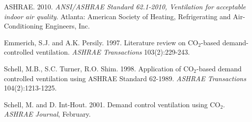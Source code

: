 ASHRAE. 2010. \emph{ANSI/ASHRAE Standard 62.1-2010, Ventilation for acceptable indoor air quality}. Atlanta: American Society of Heating, Refrigerating and Air-Conditioning Engineers, Inc.

Emmerich, S.J. and A.K. Persily. 1997. Literature review on CO\(_{2}\)-based demand-controlled ventilation. \emph{ASHRAE Transactions} 103(2):229-243.

Schell, M.B., S.C. Turner, R.O. Shim. 1998. Application of CO\(_{2}\)-based demand controlled ventilation using ASHRAE Standard 62-1989. \emph{ASHRAE Transactions} 104(2):1213-1225.

Schell, M. and D. Int-Hout. 2001. Demand control ventilation using CO\(_{2}\). \emph{ASHRAE Journal}, February.
